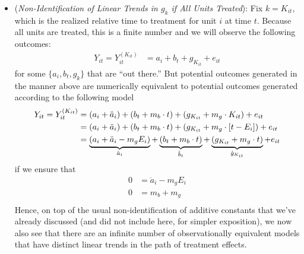 \documentclass[12pt]{article}
\theoremstyle{plain}
\theoremstyle{definition}
\theoremstyle{remark}
\begin{document}
\begin{itemize}
  \item
    (\emph{Non-Identification of Linear Trends in $g_k$ if All Units
    Treated}):
    Fix $k=K_{it}$, which is the realized relative time to treatment for
    unit $i$ at time $t$. Because all units are treated, this is a
    finite number and we will observe the following outcomes:
    \begin{align*}
      Y_{it}
      =
      Y_{it}^{(K_{it})}
      &=
      a_i
      +
      b_{t}
      +
      g_{K_{it}}
      +
      e_{it}
    \end{align*}
    for some $\{a_i,b_t,g_k\}$ that are ``out there.''
    But potential outcomes generated in the manner above are
    numerically equivalent to potential outcomes generated according
    to the following model
    \begin{align*}
      Y_{it}
      =
      Y_{it}^{(K_{it})}
      &=
      (a_i + \ddot{a}_i)
      +
      (b_t + m_b \cdot t)
      +
      (g_{K_{it}} + m_g \cdot K_{it})
      +
      e_{it}
      \\
      &=
      (a_i + \ddot{a}_i)
      +
      (b_t + m_b \cdot t)
      +
      (g_{K_{it}} + m_g \cdot [t-E_i])
      +
      e_{it}
      \\
      &=
      \underbrace{%
        (a_i + \ddot{a}_i - m_g E_i)
      }_{\hat{a}_i}
      +
      \underbrace{%
        (b_t + m_b \cdot t)
      }_{\hat{b}_t}
      +
      \underbrace{%
        (g_{K_{it}} + m_g \cdot t)
      }_{\hat{g}_{K_{it}}}
      +
      e_{it}
    \end{align*}
    if we ensure that
    \begin{align*}
      0 &= \ddot{a}_i - m_g E_i
      \\
      0 &= m_b + m_g \\
    \end{align*}
    Hence, on top of the usual non-identification of additive constants
    that we've already discussed (and did not include here, for simpler
    exposition), we now also see that there are an infinite number of
    observationally equivalent models that have distinct linear trends
    in the path of treatment effects.
\end{itemize}
\end{document}
